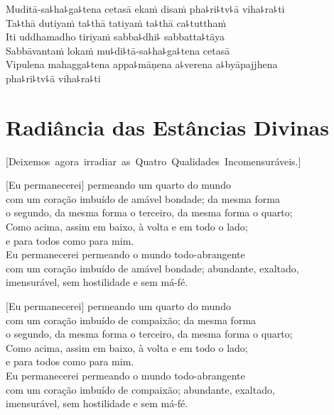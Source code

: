 Muditā-sa꜕ha꜕ga꜕tena cetasā ekaṁ disaṁ pha꜕ri꜕tv꜕ā viha꜕ra꜕ti\\
Ta꜕thā dutiyaṁ ta꜕thā tatiyaṁ ta꜕thā ca꜕tutthaṁ\\
Iti uddhamadho tiriyaṁ sabba꜕dhi꜕ sabbatta꜕tāya\\
Sabbāvantaṁ lokaṁ mu꜕di꜕tā-sa꜕ha꜕ga꜕tena cetasā\\
Vipulena mahagga꜕tena appa꜕māṇena a꜕verena a꜕byāpajjhena\\
\vin pha꜕ri꜕tv꜕ā viha꜕ra꜕ti

\chapter[Radiância das Estâncias Divinas]{Radiância das Estâncias Divinas}

\enlargethispage{\baselineskip}


\begin{leader}
  \vspace*{-\baselineskip}
  \mbox{[Deixemos agora irradiar as Quatro Qualidades Incomensuráveis.]}
\end{leader}

[Eu permanecerei] permeando um quarto do mundo\\
\vin com um coração imbuído de amável bondade; da mesma forma\\
\vin o segundo, da mesma forma o terceiro, da mesma forma o quarto;\\
Como acima, assim em baixo, à volta e em todo o lado;\\
\vin e para todos como para mim.\\
Eu permanecerei permeando o mundo todo-abrangente\\
\vin com um coração imbuído de amável bondade; abundante, exaltado,\\
\vin imensurável, sem hostilidade e sem má-fé.

[Eu permanecerei] permeando um quarto do mundo\\
\vin com um coração imbuído de compaixão; da mesma forma\\
\vin o segundo, da mesma forma o terceiro, da mesma forma o quarto;\\
Como acima, assim em baixo, à volta e em todo o lado;\\
\vin e para todos como para mim.\\
Eu permanecerei permeando o mundo todo-abrangente\\
\vin com um coração imbuído de compaixão; abundante, exaltado,\\
\vin imensurável, sem hostilidade e sem má-fé.

